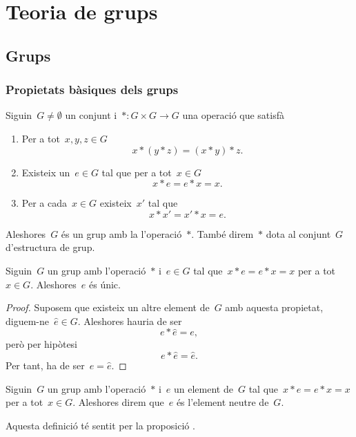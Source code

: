 \documentclass[../estructures-algebraiques.tex]{subfiles}
\begin{document}
\chapter{Teoria de grups}
\section{Grups}
    \subsection{Propietats bàsiques dels grups}
    \begin{definition}[Grup]
        \label{def:grup}
        Siguin~\(G\neq\emptyset\) un conjunt i~\(\ast\colon G\times G\to G\) una operació que satisfà
        \begin{enumerate}
            \item Per a tot~\(x,y,z\in G\)
            \[
                x\ast(y\ast z)=(x\ast y)\ast z.
            \]
            \item Existeix un~\(e\in G\) tal que per a tot~\(x\in G\)
            \[
                x\ast e=e\ast x=x.
            \]
            \item Per a cada~\(x\in G\) existeix~\(x'\) tal que
            \[
                x\ast x'=x'\ast x=e.
            \]
        \end{enumerate}
        Aleshores~\(G\) és un grup amb la l'operació~\(\ast\).
        També direm~\(\ast\) dota al conjunt~\(G\) d'estructura de grup.
    \end{definition}
    \begin{proposition}
        \label{prop:unicitat-neutre-del-grup}
        Siguin~\(G\) un grup amb l'operació~\(\ast\) i~\(e\in G\) tal que~\(x\ast e=e\ast x=x\) per a tot~\(x\in G\).
        Aleshores~\(e\) és únic.
    \end{proposition}
    \begin{proof}
        Suposem que existeix un altre element de~\(G\) amb aquesta propietat, diguem-ne~\(\hat{e}\in G\).
        Aleshores hauria de ser
        \[
            e\ast\hat{e}=e,
        \]
        però per hipòtesi
        \[
            e\ast\hat{e}=\hat{e}.
        \]
        Per tant, ha de ser~\(e=\hat{e}\).
    \end{proof}
    \begin{definition}
        \label{def:lelement-neutre-del-grup}
        Siguin~\(G\) un grup amb l'operació~\(\ast\) i~\(e\) un element de~\(G\) tal que~\(x\ast e=e\ast x=x\) per a tot~\(x\in G\).
        Aleshores direm que~\(e\) és l'element neutre de~\(G\).

        Aquesta definició té sentit per la proposició .
    \end{definition}
\end{document}
